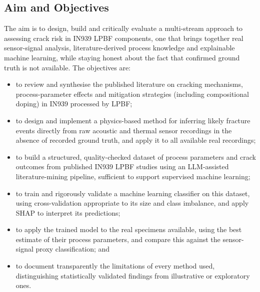 \documentclass[a4paper]{article}
\begin{document}
\subsection{Aim and Objectives}
The aim is to design, build and critically evaluate a multi-stream approach to assessing crack risk in IN939 LPBF components, one that brings together real sensor-signal analysis, literature-derived process knowledge and explainable machine learning, while staying honest about the fact that confirmed ground truth is not available. The objectives are:
\begin{itemize}
  \item to review and synthesise the published literature on cracking mechanisms, process-parameter effects and mitigation strategies (including compositional doping) in IN939 processed by LPBF;
  \item to design and implement a physics-based method for inferring likely fracture events directly from raw acoustic and thermal sensor recordings in the absence of recorded ground truth, and apply it to all available real recordings;
  \item to build a structured, quality-checked dataset of process parameters and crack outcomes from published IN939 LPBF studies using an LLM-assisted literature-mining pipeline, sufficient to support supervised machine learning;
  \item to train and rigorously validate a machine learning classifier on this dataset, using cross-validation appropriate to its size and class imbalance, and apply SHAP to interpret its predictions;
  \item to apply the trained model to the real specimens available, using the best estimate of their process parameters, and compare this against the sensor-signal proxy classification; and
  \item to document transparently the limitations of every method used, distinguishing statistically validated findings from illustrative or exploratory ones.
\end{itemize}
\end{document}
